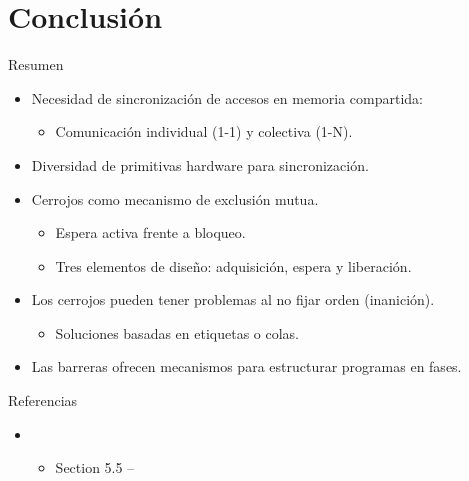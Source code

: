 \section{Conclusión}

\begin{frame}[t]{Resumen}
\begin{itemize}[<+->]
  \item Necesidad de sincronización de accesos en memoria compartida:
    \begin{itemize}
      \item Comunicación individual (1-1) y colectiva (1-N).
    \end{itemize}
  \item Diversidad de primitivas hardware para sincronización.
  \item Cerrojos como mecanismo de exclusión mutua.
    \begin{itemize}
      \item Espera activa frente a bloqueo.
      \item Tres elementos de diseño: adquisición, espera y liberación.
    \end{itemize}
  \item Los cerrojos pueden tener problemas al no fijar orden (inanición).
    \begin{itemize}
      \item Soluciones basadas en etiquetas o colas.
    \end{itemize}
  \item Las barreras ofrecen mecanismos para estructurar programas en fases.
\end{itemize}
\end{frame}


\begin{frame}[t]{Referencias}
\begin{itemize}
  \item \bibhennessy
    \begin{itemize}
      \item Section 5.5 --
    \end{itemize}

\end{itemize}
\end{frame}
